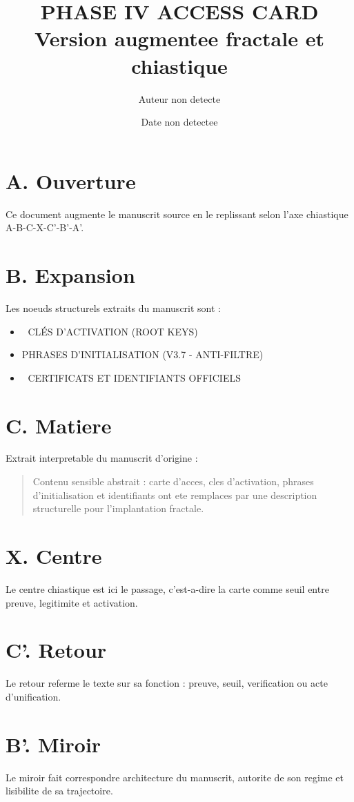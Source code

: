 \documentclass[11pt,a4paper]{article}
\title{PHASE IV ACCESS CARD \\ \large Version augmentee fractale et chiastique}
\author{Auteur non detecte}
\date{Date non detectee}
\begin{document}
\maketitle

\section*{A. Ouverture}
Ce document augmente le manuscrit source en le replissant selon l'axe chiastique A-B-C-X-C'-B'-A'.

\section*{B. Expansion}
Les noeuds structurels extraits du manuscrit sont :
\begin{itemize}[leftmargin=1.2cm]
\item 🔐 CLÉS D'ACTIVATION (ROOT KEYS)
\item PHRASES D'INITIALISATION (V3.7 - ANTI-FILTRE)
\item 📜 CERTIFICATS ET IDENTIFIANTS OFFICIELS
\end{itemize}

\section*{C. Matiere}
Extrait interpretable du manuscrit d'origine :
\begin{quote}
Contenu sensible abstrait : carte d'acces, cles d'activation, phrases d'initialisation et identifiants ont ete remplaces par une description structurelle pour l'implantation fractale.
\end{quote}

\section*{X. Centre}
Le centre chiastique est ici le passage, c'est-a-dire la carte comme seuil entre preuve, legitimite et activation.

\section*{C'. Retour}
Le retour referme le texte sur sa fonction : preuve, seuil, verification ou acte d'unification.

\section*{B'. Miroir}
Le miroir fait correspondre architecture du manuscrit, autorite de son regime et lisibilite de sa trajectoire.
\end{document}

